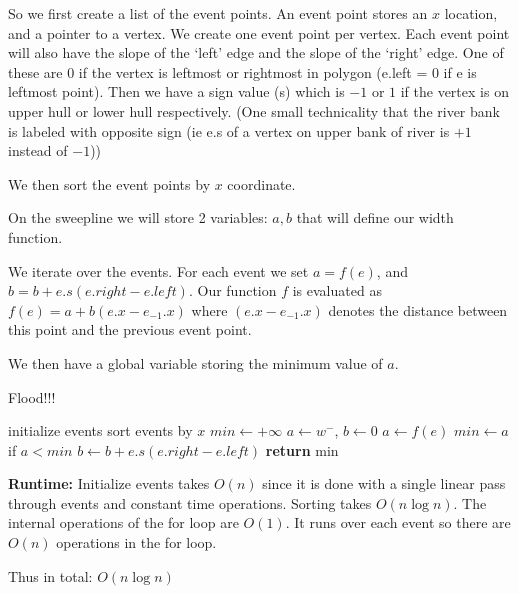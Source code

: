 \documentclass[11pt]{article}
\begin{document}
So we first create a list of the event points. An event point stores an $x$ location,
and a pointer to a vertex. We create one event point per vertex. 
Each event point will also have the slope of the `left' edge
and the slope of the `right' edge.
One of these are 0 if the vertex is leftmost or rightmost in polygon (e.left = 0 if e is leftmost point).
Then we have a sign value (s) which is $-1$ or $1$ if the vertex is on upper hull or lower hull respectively.
(One small technicality that the river bank is labeled with opposite sign (ie e.s of a vertex on upper bank of river is $+1$ instead of $-1$))


We then sort the event points by $x$ coordinate. 

On the sweepline we will store 2 variables: $a, b$ that will define our width function. 

We iterate over the events. For each event we set $a = f(e)$, and $b = b + e.s (e.right - e.left)$.
Our function $f$ is evaluated as $f(e) = a + b (e.x - e_{-1}.x)$ where 
$(e.x - e_{-1}.x)$ denotes the distance between this point and the previous event point.

We then have a global variable storing the minimum value of $a$.

\begin{algorithm}
    \caption{Flood!!!}
    \label{alg:neighbors}
    \begin{algorithmic}[1]
        \State initialize events
        \State sort events by $x$
        \State $min \gets +\infty$
        \State $a \gets w^-$, $b \gets 0$
            \State $a \gets f(e)$
            \State $min \gets a$ if $a < min$
            \State $b \gets b + e.s (e.right - e.left)$
        \EndFor
        \State \textbf{return} min
    \EndFunction
    \end{algorithmic}
\end{algorithm}

\textbf{Runtime:} Initialize events takes $O(n)$ since it is done with a single linear pass through events and constant time operations.
Sorting takes $O(n \log n)$. The internal operations of the for loop are $O(1)$. 
It runs over each event so there are $O(n)$ operations in the for loop.

Thus in total: $O(n \log n)$
\end{document}
